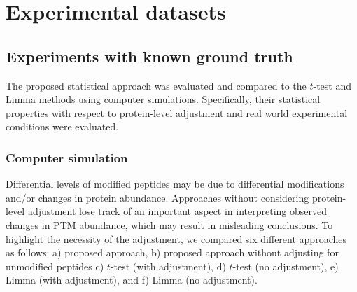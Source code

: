\documentclass{mcp}
\begin{document}

\clearpage
\section{Experimental datasets}
\label{sec:experiments}
\subsection{Experiments with known ground truth}
\label{sec:sim}

The proposed statistical approach was evaluated and compared to the $t$-test and Limma methods using computer simulations. Specifically, their statistical properties with respect to protein-level adjustment and real world experimental conditions were evaluated.


\subsubsection{Computer simulation}
\label{sec:comp_sim}
Differential levels of modified peptides may be due to differential modifications and/or changes in protein abundance. Approaches without considering protein-level adjustment lose track of an important aspect in interpreting observed changes in PTM abundance, which may result in misleading conclusions. To highlight the necessity of the adjustment, we compared six different approaches as follows: a) proposed approach, b) proposed approach without adjusting for unmodified peptides c) $t$-test (with adjustment), d) $t$-test (no adjustment), e) Limma (with adjustment), and f) Limma (no adjustment).
\end{document}
